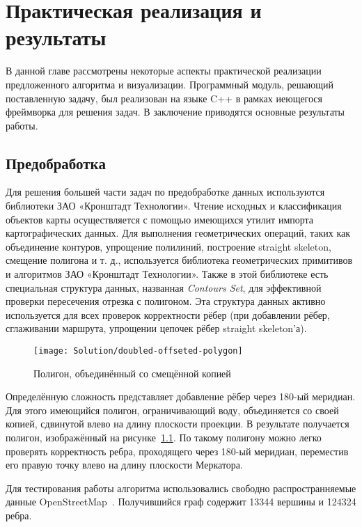 \chapter{Практическая реализация и результаты}

В данной главе рассмотрены некоторые аспекты практической реализации
предложенного алгоритма и визуализации. Программный модуль, решающий
поставленную задачу, был реализован на языке C++ в рамках иеющегося
фреймворка для решения задач. В заключение приводятся основные
результаты работы.

\FloatBarrier

\section{Предобработка}

Для решения большей части задач по предобработке данных используются
библиотеки ЗАО «Кронштадт Технологии». Чтение исходных и классификация
объектов карты осуществляется с помощью имеющихся утилит импорта
картографических данных. Для выполнения геометрических операций, таких
как объединение контуров, упрощение полилиний, построение straight
skeleton, смещение полигона и т. д., используется библиотека
геометрических примитивов и алгоритмов ЗАО «Кронштадт Технологии».
Также в этой библиотеке есть специальная структура данных, названная
\emph{Contours Set}, для эффективной проверки пересечения отрезка с
полигоном. Эта структура данных активно используется для всех проверок
корректности рёбер (при добавлении рёбер, сглаживании маршрута,
упрощении цепочек рёбер straight skeleton'а).

\begin{figure}
    \texttt{[image: Solution/doubled-offseted-polygon]}
    \caption{Полигон, объединённый со смещённой копией}
    \label{fig:doubled-polygon}
\end{figure}

Определённую сложность представляет добавление рёбер через 180-ый
меридиан. Для этого имеющийся полигон, ограничивающий воду,
объединяется со своей копией, сдвинутой влево на длину плоскости
проекции. В результате получается полигон, изображённый на
рисунке~\ref{fig:doubled-polygon}. По такому полигону можно легко
проверять корректность ребра, проходящего через 180-ый меридиан,
переместив его правую точку влево на длину плоскости Меркатора.

Для тестирования работы алгоритма использовались свободно
распространняемые данные OpenStreetMap~\cite{osm}. Получившийся граф
содержит 13344 вершины и 124324 ребра.

